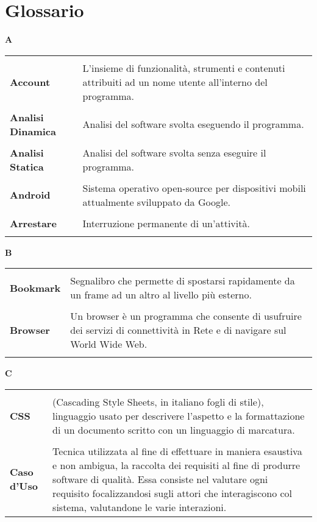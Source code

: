 \section{Glossario}{ 
\hfill\Huge{\textbf{A}} \\ 
\normalsize 
\begin{longtabu} to  
\toprule \\ 
\textbf{Account} & L'insieme di funzionalità, strumenti e contenuti attribuiti ad un nome utente all'interno del programma. \\ 
 \\ 
\textbf{Analisi Dinamica} & Analisi del software svolta eseguendo il programma. \\ 
 \\ 
\textbf{Analisi Statica} & Analisi del software svolta senza eseguire il programma. \\ 
 \\ 
\textbf{Android} & Sistema operativo open-source per dispositivi mobili attualmente sviluppato da Google. \\ 
 \\ 
\textbf{Arrestare} & Interruzione permanente di un’attività. \\ 
 \\ 
\end{longtabu} 
\newpage 
\hfill\Huge{\textbf{B}} \\ 
\normalsize 
\begin{longtabu} to  
\toprule \\ 
\textbf{Bookmark} & Segnalibro che permette di spostarsi rapidamente da un frame ad un altro al livello più esterno. \\ 
 \\ 
\textbf{Browser} & Un browser è un programma che consente di usufruire dei servizi di connettività in Rete e di navigare sul World Wide Web. \\ 
 \\ 
\end{longtabu} 
\newpage 
\hfill\Huge{\textbf{C}} \\ 
\normalsize 
\begin{longtabu} to  
\toprule \\ 
\textbf{CSS} & (Cascading Style Sheets, in italiano fogli di stile), linguaggio usato per descrivere l’aspetto e la formattazione di un documento scritto con un linguaggio di marcatura. \\ 
 \\ 
\textbf{Caso d'Uso} & Tecnica utilizzata al fine di effettuare in maniera esaustiva e non ambigua, la raccolta dei requisiti al fine di produrre software di qualità. Essa consiste nel valutare ogni requisito focalizzandosi sugli attori che interagiscono col sistema, valutandone le varie interazioni. \\ 

\end{longtabu}}
